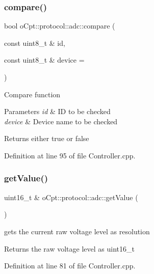 \subsubsection{\texorpdfstring{compare()}{compare()}}
{\footnotesize\ttfamily bool o\+Cpt\+::protocol\+::adc\+::compare (\begin{DoxyParamCaption}\item[{const uint8\+\_\+t \&}]{id,  }\item[{const uint8\+\_\+t \&}]{device = {} }\end{DoxyParamCaption})}

Compare function 
\begin{DoxyParams}{Parameters}
{\em id} & ID to be checked \\
\hline
{\em device} & Device name to be checked \\
\hline
\end{DoxyParams}
\begin{DoxyReturn}{Returns}
either true or false 
\end{DoxyReturn}


Definition at line 95 of file Controller.\+cpp.

\hypertarget{classo_cpt_1_1protocol_1_1adc_a78a1abf9c5d72b7da8efea1be21e0a85}{}\label{classo_cpt_1_1protocol_1_1adc_a78a1abf9c5d72b7da8efea1be21e0a85} 
\subsubsection{\texorpdfstring{get\+Value()}{getValue()}}
{\footnotesize\ttfamily uint16\+\_\+t \& o\+Cpt\+::protocol\+::adc\+::get\+Value (\begin{DoxyParamCaption}{ }\end{DoxyParamCaption})}

gets the current raw voltage level as resolution \begin{DoxyReturn}{Returns}
the raw voltage level as uint16\+\_\+t 
\end{DoxyReturn}


Definition at line 81 of file Controller.\+cpp.

\hypertarget{classo_cpt_1_1protocol_1_1adc_afd7e7e1ab0855f53227a4fbf91449687}{}\label{classo_cpt_1_1protocol_1_1adc_afd7e7e1ab0855f53227a4fbf91449687} 
